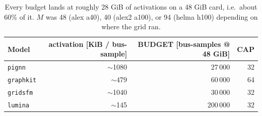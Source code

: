 \documentclass[10pt]{article}
\begin{document}
\begin{table}[H]
\centering\small
\begin{tabular}{lrrr}
\toprule
Model & activation [KiB / bus-sample] & BUDGET [bus-samples @ 48 GiB] & CAP \\
\midrule
\texttt{pignn}    & $\sim$1080 & 27\,000  & 32 \\
\texttt{graphkit} & $\sim$479  & 60\,000  & 64 \\
\texttt{gridsfm}  & $\sim$1040 & 30\,000  & 32 \\
\texttt{lumina}   & $\sim$145  & 200\,000 & 32 \\
\bottomrule
\end{tabular}
\caption{Every budget lands at roughly 28 GiB of activations on a 48 GiB card,
i.e.\ about 60\% of it. $M$ was 48 (alex a40), 40 (alex2 a100), or 94 (helma
h100) depending on where the grid ran.}
\end{table}
\end{document}
